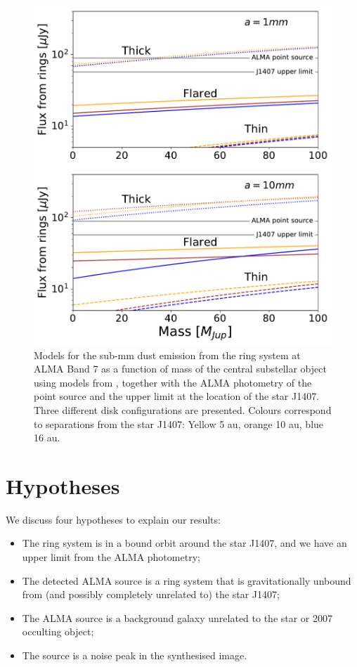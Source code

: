 \documentclass{aa} %
\begin{document}
\begin{figure}[tbh]
\begin{center}
\includegraphics[width=0.75\columnwidth]{free_floating_ring_fluxes_interpolated_2_panel.pdf}
\caption{\label{fig:fluxmodel}Models for the sub-mm dust emission from the ring system at ALMA Band 7 as a function of mass of the central substellar object using models from \citet{Baraffe08}, together with the ALMA photometry of the point source and the upper limit at the location of the star J1407. Three different disk configurations are presented. Colours correspond to separations from the star J1407: Yellow  5 au, orange  10 au, blue  16 au.}
\end{center}
\end{figure}%

\section{Hypotheses}\label{discuss} %

We discuss four hypotheses to explain our results: 
\begin{itemize}
    \item The ring system is in a bound orbit around the star J1407, and we have an upper limit from the ALMA photometry; 
    \item The detected ALMA source is a ring system that is gravitationally unbound from (and possibly completely unrelated to) the star J1407;
    \item The ALMA source is a background galaxy unrelated to the star or 2007 occulting object; 
    \item The source is a noise peak in the synthesised image. 
\end{itemize}
\end{document}
